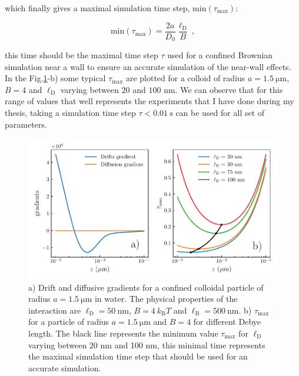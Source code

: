 which finally gives a maximal simulation time step, $\mathrm{min}(\tau_\mathrm{max})$:

\begin{equation}
	\mathrm{min}(\tau_\mathrm{max}) =  \frac{2 a}{D_0} \frac{\ell_\mathrm{D}}{B} ~,
\end{equation}

this time should be the maximal time step $\tau$ used for a confined Brownian simulation near a wall to ensure an accurate simulation of the near-wall effects. In the Fig.\ref{fig.taumax}-b) some typical $\tau_{\mathrm{max}}$ are plotted for a colloid of radius $a=1.5 ~\mathrm{\mu m}$, $B = 4$ and $\ell _\mathrm{D}$ varying between $20$ and $100$ nm. We can observe that for this range of values that well represents the experiments that I have done during my thesis, taking a simulation time step $\tau < 0.01 ~ \mathrm{s}$ can be used for all set of parameters.


\begin{figure}[ht]
	\centering
	\includegraphics{02_body/chapter3/images/simulation_confined_Brownian_motion/maximal_tau.pdf}
	\caption{a) Drift and diffusive gradients for a confined colloidal particle of radius $a = 1.5 ~\mathrm{\mu m}$ in water. The physical properties of the interaction are $\ell_\mathrm{D} = 50 ~ \mathrm{nm}$, $B = 4 ~k_\mathrm{B}T$ and $\ell_\mathrm{B} = 500 ~ \mathrm{nm}$. b) $\tau_\mathrm{max}$ for a particle of radius $a = 1.5 ~\mathrm{\mu m}$ and $B = 4$ for different Debye length. The black line represents the minimum value $\tau_\mathrm{max}$ for $\ell_\mathrm{D}$ varying between 20 nm and 100 nm, this minimal time represents the maximal simulation time step that should be used for an accurate simulation.} 
	\label{fig.taumax}
\end{figure}

